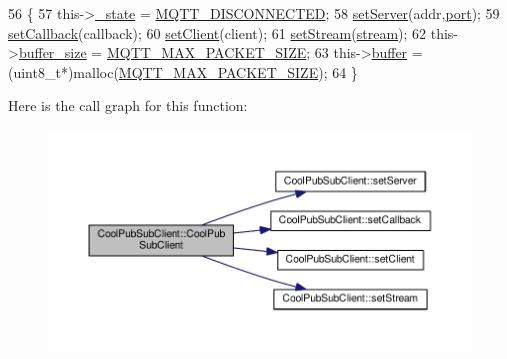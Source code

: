 \begin{DoxyCode}
56                                                                                                            
                    \{
57     this->\hyperlink{class_cool_pub_sub_client_aa1953b601206252a30efa5b114eb3e1a}{\_state} = \hyperlink{_cool_pub_sub_client_8h_adaf86a906a305dd129164982d50111b3}{MQTT\_DISCONNECTED};
58     \hyperlink{class_cool_pub_sub_client_a947e70c394c66c7d08d0c53caf8425e3}{setServer}(addr,\hyperlink{class_cool_pub_sub_client_a01e3249102c057756af7a515c179844e}{port});
59     \hyperlink{class_cool_pub_sub_client_ac5cab7658f1bdded32131241e468e661}{setCallback}(callback);
60     \hyperlink{class_cool_pub_sub_client_a7ee119b786010561ab6a9afa0798e91d}{setClient}(client);
61     \hyperlink{class_cool_pub_sub_client_ae97e40823ea689ff9e36d5bdd71bb933}{setStream}(\hyperlink{class_cool_pub_sub_client_a7a92417b317e7bd9502ed37752111705}{stream});
62     this->\hyperlink{class_cool_pub_sub_client_ae6cb10e42c057483d53516ac830ab526}{buffer\_size} = \hyperlink{_cool_pub_sub_client_8h_ae09b594688a59f1427c7e45259e039b9}{MQTT\_MAX\_PACKET\_SIZE};
63     this->\hyperlink{class_cool_pub_sub_client_a7e8bcc6096626916046a51bebadc7851}{buffer} = (uint8\_t*)malloc(\hyperlink{_cool_pub_sub_client_8h_ae09b594688a59f1427c7e45259e039b9}{MQTT\_MAX\_PACKET\_SIZE});
64 \}
\end{DoxyCode}
Here is the call graph for this function\+:\nopagebreak
\begin{figure}[H]
\begin{center}
\leavevmode
\includegraphics[width=350pt]{d8/d4b/class_cool_pub_sub_client_a0797679d710bf2b1aa802107bdb1a2fe_cgraph}
\end{center}
\end{figure}
\mbox{\label{class_cool_pub_sub_client_a15e4dd41ebda943c377539086f70469d}} 
